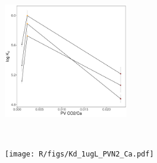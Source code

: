 \begin{figure}[t!]
\begin{subfigure}[t]{0.5\textwidth}
        \caption{}
        \label{subfig:SACO2_Ca}
    \end{subfigure}
    \medskip
    \begin{subfigure}[t]{0.5\textwidth}
        \centering
        \includegraphics[height=5cm]{R/figs/Kd_1ugL_PVCO2_Ca.pdf}
        \caption{}
        \label{subfig:PVCO2_Ca}
    \end{subfigure}%
    ~ 
    \begin{subfigure}[t]{0.5\textwidth}
        \centering
        \texttt{[image: R/figs/Kd\_1ugL\_PVN2\_Ca.pdf]}
        \caption{}
        \label{subfig:PVN2_Ca}
    \end{subfigure}
\end{figure}
